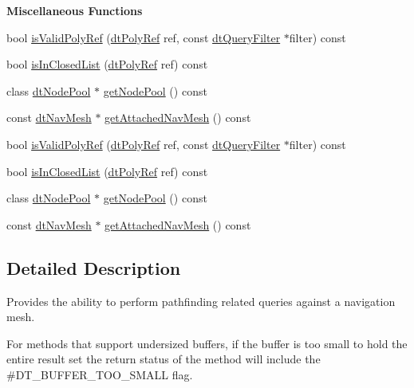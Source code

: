 \begin{Indent}\textbf{ Miscellaneous Functions}\par
\begin{DoxyCompactItemize}
\item 
bool \hyperlink{classdtNavMeshQuery_ac76164ed97fdedd9ea8abbe52f6c2c8a}{is\+Valid\+Poly\+Ref} (\hyperlink{group__detour_gab4e0b2257a670c1a800057999612b466}{dt\+Poly\+Ref} ref, const \hyperlink{classdtQueryFilter}{dt\+Query\+Filter} $\ast$filter) const
\item 
bool \hyperlink{classdtNavMeshQuery_ad1de0c0d7cc527905d3f83c613897eb3}{is\+In\+Closed\+List} (\hyperlink{group__detour_gab4e0b2257a670c1a800057999612b466}{dt\+Poly\+Ref} ref) const
\item 
class \hyperlink{classdtNodePool}{dt\+Node\+Pool} $\ast$ \hyperlink{classdtNavMeshQuery_a5f5baaa868aad36ba023ea81b10e70bd}{get\+Node\+Pool} () const
\item 
const \hyperlink{classdtNavMesh}{dt\+Nav\+Mesh} $\ast$ \hyperlink{classdtNavMeshQuery_a05ddaa41019804494be7da66207882de}{get\+Attached\+Nav\+Mesh} () const
\item 
bool \hyperlink{classdtNavMeshQuery_ac76164ed97fdedd9ea8abbe52f6c2c8a}{is\+Valid\+Poly\+Ref} (\hyperlink{group__detour_gab4e0b2257a670c1a800057999612b466}{dt\+Poly\+Ref} ref, const \hyperlink{classdtQueryFilter}{dt\+Query\+Filter} $\ast$filter) const
\item 
bool \hyperlink{classdtNavMeshQuery_ad1de0c0d7cc527905d3f83c613897eb3}{is\+In\+Closed\+List} (\hyperlink{group__detour_gab4e0b2257a670c1a800057999612b466}{dt\+Poly\+Ref} ref) const
\item 
class \hyperlink{classdtNodePool}{dt\+Node\+Pool} $\ast$ \hyperlink{classdtNavMeshQuery_a5f5baaa868aad36ba023ea81b10e70bd}{get\+Node\+Pool} () const
\item 
const \hyperlink{classdtNavMesh}{dt\+Nav\+Mesh} $\ast$ \hyperlink{classdtNavMeshQuery_a05ddaa41019804494be7da66207882de}{get\+Attached\+Nav\+Mesh} () const
\end{DoxyCompactItemize}
\end{Indent}


\subsection{Detailed Description}
Provides the ability to perform pathfinding related queries against a navigation mesh.

For methods that support undersized buffers, if the buffer is too small to hold the entire result set the return status of the method will include the \#\+D\+T\+\_\+\+B\+U\+F\+F\+E\+R\+\_\+\+T\+O\+O\+\_\+\+S\+M\+A\+LL flag.

